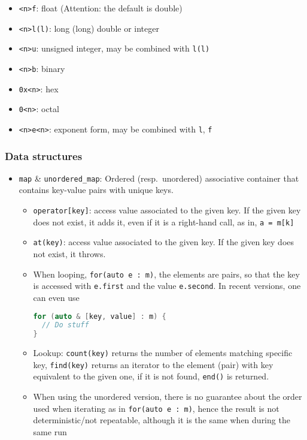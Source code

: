 \documentclass[a4paper,12pt,%
              final%
              ]{article}
\begin{document}
\begin{itemize}
\begin{itemize}
      \item \texttt{<n>f}: float (Attention: the default is double)
      \item \texttt{<n>l(l)}: long (long) double or integer
      \item \texttt{<n>u}: unsigned integer, may be combined with \texttt{l(l)}
      \item \texttt{<n>b}: binary
      \item \texttt{0x<n>}: hex
      \item \texttt{0<n>}: octal
      \item \texttt{<n>e<n>}: exponent form, may be combined with \texttt{l}, \texttt{f}
    \end{itemize}
\end{itemize}

\subsubsection{Data structures}
\begin{itemize}
  \item \verb|map| \& \verb|unordered_map|: Ordered (resp.\ unordered) associative container that contains key-value pairs with unique keys.
    \begin{itemize}
      \item \verb|operator[key]|: access value associated to the given key. If the given key does not exist, it adds it, even if it is a right-hand call, as in, \verb|a = m[k]|
      \item \verb|at(key)|: access value associated to the given key. If the given key does not exist, it throws.
      \item When looping, \verb|for(auto e : m)|, the elements are pairs, so that the key is accessed with \verb|e.first| and the value \verb|e.second|. In recent versions, one can even use
        \begin{lstlisting}[language=C++]
for (auto & [key, value] : m) {
  // Do stuff
}
        \end{lstlisting}
      \item Lookup: \verb|count(key)| returns the number of elements matching specific key, \verb|find(key)| returns an iterator to the element (pair) with key equivalent to the given one, if it is not found, \verb|end()| is returned.
      \item When using the unordered version, there is no guarantee about the order used when iterating as in \verb|for(auto e : m)|, hence the result is not deterministic/not repeatable, although it is the same when during the same run
    \end{itemize}
\end{itemize}
\end{document}
